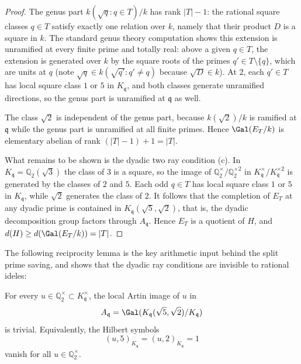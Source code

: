 \begin{proof}
The genus part $k(\sqrt q:q\in T)/k$ has rank $|T|-1$: the rational square classes $q\in T$ satisfy exactly one relation over $k$, namely that their product $D$ is a square in $k$.  The standard genus theory computation shows this extension is unramified at every finite prime and totally real: above a given $q\in T$, the extension is generated over $k$ by the square roots of the primes $q'\in T\setminus\{q\}$, which are units at $q$ (note $\sqrt q\in k(\sqrt{q'}:q'\ne q)$ because $\sqrt D\in k$).  At $2$, each $q'\in T$ has local square class $1$ or $5$ in $K_{\mathfrak{q}}$, and both classes generate unramified directions, so the genus part is unramified at $\mathfrak{q}$ as well.

The class $\sqrt2$ is independent of the genus part, because $k(\sqrt2)/k$ is ramified at $\mathfrak{q}$ while the genus part is unramified at all finite primes.  Hence $\Gal(E_T/k)$ is elementary abelian of rank $(|T|-1)+1=|T|$.

What remains to be shown is the dyadic two ray condition (c).  In $K_{\mathfrak{q}}=\mathbb{Q}_2(\sqrt3)$ the class of $3$ is a square, so the image of $\mathbb{Q}_2^\times/\mathbb{Q}_2^{\times2}$ in $K_{\mathfrak{q}}^\times/K_{\mathfrak{q}}^{\times2}$ is generated by the classes of $2$ and $5$.  Each odd $q\in T$ has local square class $1$ or $5$ in $K_{\mathfrak{q}}$, while $\sqrt2$ generates the class of $2$.  It follows that the completion of $E_T$ at any dyadic prime is contained in $K_{\mathfrak{q}}(\sqrt5,\sqrt2)$, that is, the dyadic decomposition group factors through $A_{\mathfrak{q}}$.  Hence $E_T$ is a quotient of $H$, and $d(H)\geq d(\Gal(E_T/k))=|T|$.
\end{proof}

The following reciprocity lemma is the key arithmetic input behind the split prime saving, and shows that the dyadic ray conditions are invisible to rational ideles:

\begin{lemma}\label{lem:artin-trivial}
For every $u\in\mathbb{Q}_2^\times\subset K_{\mathfrak{q}}^\times$, the local Artin image of $u$ in
\[
   A_{\mathfrak{q}}=\Gal(K_{\mathfrak{q}}(\sqrt5,\sqrt2)/K_{\mathfrak{q}})
\]
is trivial.  Equivalently, the Hilbert symbols
\[
   (u,5)_{K_{\mathfrak{q}}}=(u,2)_{K_{\mathfrak{q}}}=1
\]
vanish for all $u\in\mathbb{Q}_2^\times$.
\end{lemma}

